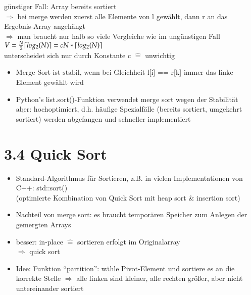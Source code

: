         günstiger Fall: Array bereits sortiert \\

        $\Rightarrow$ bei merge werden zuerst alle Elemente von l gewählt, dann r an das Ergebnis-Array angehängt \\

        $\Rightarrow$ man braucht nur halb so viele Vergleiche wie im ungünstigen Fall \\

        \hspace*{5mm} $V= \frac{N}{2} \lceil log_2(N)\rceil = c N * \lceil log_2(N)\rceil$ \\

        unterscheidet sich nur durch Konstante c $\widehat{=}$ unwichtig \\

        \begin{itemize}
            \item Merge Sort ist $\underline{\text{stabil}}$, wenn bei Gleichheit l[i] == r[k] immer das $\underline{\text{linke}}$ Element gewählt wird
            \item Python's list.sort()-Funktion verwendet merge sort wegen der Stabilität\\
            $\underline{\text{aber}}$: hochoptimiert, d.h. häufige Spezialfälle (bereits sortiert, umgekehrt sortiert) werden abgefangen und schneller implementiert
        \end{itemize}

    \section*{3.4 Quick Sort}

    \begin{itemize}
        \item Standard-Algorithmus für Sortieren, z.B. in vielen Implementationen von C++:  std::sort() \\
        (optimierte Kombination von Quick Sort mit heap sort \& insertion sort)
        \item Nachteil von merge sort: es braucht temporären Speicher zum Anlegen der gemergten Arrays
        \item besser: in-place $\widehat{=}$ sortieren erfolgt im Originalarray \\
        $\Rightarrow$ quick sort
        \item Idee: Funktion ``partition'': wähle Pivot-Element und sortiere es an die korrekte Stelle $\Rightarrow$ alle linken sind kleiner, alle rechten größer, aber nicht untereinander sortiert
    \end{itemize}

